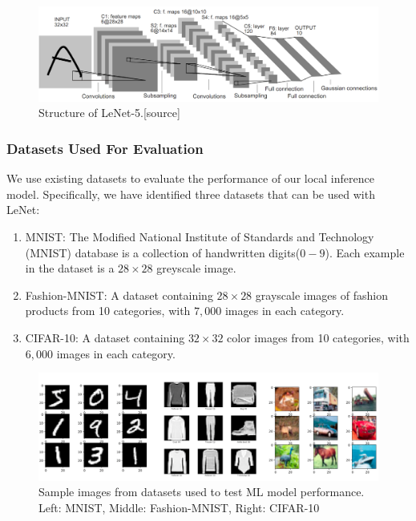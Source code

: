 \documentclass[twoside]{report}
\begin{document}
\begin{figure}[ht]
    \centering
    \includegraphics[width=1.0\linewidth]{method/lenet5.png}
    \caption{Structure of LeNet-5.[source]}
    \label{fig:lenet5}
\end{figure}

\subsubsection{Datasets Used For Evaluation}
We use existing datasets to evaluate the performance of our local inference model. Specifically, 
we have identified three datasets that can be used with LeNet:
\begin{enumerate}
    \item MNIST: The Modified National Institute of Standards and Technology (MNIST) database 
          is a collection of handwritten digits($0-9$). Each example in the dataset is a $28\times28$ 
          greyscale image.
    \item Fashion-MNIST: A dataset containing $28\times28$ grayscale images of fashion products 
    from 10 categories, with $7,000$ images in each category.
    \item CIFAR-10: A dataset containing $32\times32$ color images from 10 categories, 
    with $6,000$ images in each category.
\end{enumerate}

\begin{figure}[ht]
    \centering
    \includegraphics[width=1.0\linewidth]{method/datasets.png}
    \caption{Sample images from datasets used to test ML model performance. \\Left: MNIST, Middle: Fashion-MNIST, Right: CIFAR-10}
    \label{fig:datasets}
\end{figure}
\end{document}
